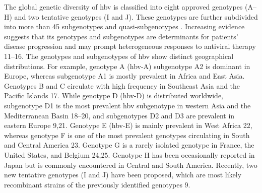 The global genetic diversity of \gls{hbv} is classified into eight approved genotypes (A--H) and two tentative genotypes (I and J).
These genotypes are further subdivided into more than 45 subgenotypes and quasi-subgenotypes \cite{pourkarim2014molecular,thijssen2020novel}.
Increasing evidence suggests that its genotypes and subgenotypes are determinants for patients' disease progression and may prompt heterogeneous responses to antiviral therapy 11--16.
The genotypes and subgenotypes of \gls{hbv} show distinct geographical distributions.
For example, genotype A (\gls{hbv}-A) subgenotype A2 is dominant in Europe, whereas subgenotype A1 is mostly prevalent in Africa and East Asia.
Genotypes B and C circulate with high frequency in Southeast Asia and the Pacific Islands 17.
While genotype D (\gls{hbv}-D) is distributed worldwide, subgenotype D1 is the most prevalent \gls{hbv} subgenotype in western Asia and the Mediterranean Basin 18--20, and subgenotypes D2 and D3 are prevalent in eastern Europe 9,21.
Genotype E (\gls{hbv}-E) is mainly prevalent in West Africa 22, whereas genotype F is one of the most prevalent genotypes circulating in South and Central America 23.
Genotype G is a rarely isolated genotype in France, the United States, and Belgium 24,25.
Genotype H has been occasionally reported in Japan but is commonly encountered in Central and South America.
Recently, two new tentative genotypes (I and J) have been proposed, which are most likely recombinant strains of the previously identified genotypes 9.\\

